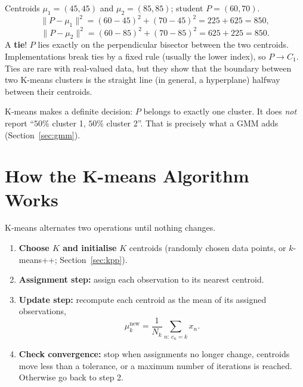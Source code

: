 \documentclass[11pt,a4paper]{article}
\begin{document}
\begin{example}
Centroids $\mu_1=(45,45)$ and $\mu_2=(85,85)$; student $P=(60,70)$.
\[
\|P-\mu_1\|^2=(60-45)^2+(70-45)^2=225+625=850,
\]
\[
\|P-\mu_2\|^2=(60-85)^2+(70-85)^2=625+225=850.
\]
A \textbf{tie}! $P$ lies exactly on the perpendicular bisector between the two centroids. Implementations break ties by a fixed rule (usually the lower index), so $P\to C_1$. Ties are rare with real-valued data, but they show that the boundary between two K-means clusters is the straight line (in general, a hyperplane) halfway between their centroids.
\end{example}

\begin{caution}
K-means makes a definite decision: $P$ belongs to exactly one cluster. It does \emph{not} report ``$50\%$ cluster 1, $50\%$ cluster 2''. That is precisely what a GMM adds (Section~\ref{sec:gmm}).
\end{caution}

\section{How the K-means Algorithm Works}

K-means alternates two operations until nothing changes.

\begin{enumerate}[leftmargin=*]
\item \textbf{Choose $K$ and initialise} $K$ centroids (randomly chosen data points, or $k$-means++; Section~\ref{sec:kpp}).
\item \textbf{Assignment step:} assign each observation to its nearest centroid.
\item \textbf{Update step:} recompute each centroid as the mean of its assigned observations,
\[
\mu_k^{\text{new}}=\frac{1}{N_k}\sum_{n:\,c_n=k}x_n .
\]
\item \textbf{Check convergence:} stop when assignments no longer change, centroids move less than a tolerance, or a maximum number of iterations is reached. Otherwise go back to step 2.
\end{enumerate}
\end{document}
